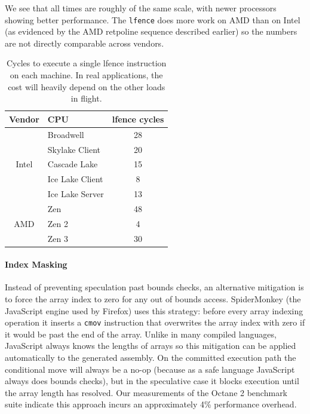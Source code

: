 We see that all times are roughly of the same scale, with newer processors showing better performance.
The \texttt{lfence} does more work on AMD than on Intel (as evidenced by the AMD retpoline sequence described earlier) so the numbers are not directly comparable across vendors.

\begin{table}[h]
  \begin{center}
  \begin{tabular}{ clc }
    \textbf{Vendor} & \textbf{CPU} & \textbf{lfence cycles} \\ \hline
    \multirow{5}{*}{Intel} & Broadwell        & 28 \\
                           & Skylake Client   & 20 \\
                           & Cascade Lake     & 15 \\
                           & Ice Lake Client  & 8 \\
                           & Ice Lake Server  & 13  \\ \hline
    \multirow{3}{*}{AMD}   & Zen              & 48 \\
                           & Zen 2            & 4 \\
                           & Zen 3            & 30 \\ \hline
  \end{tabular}
  \end{center}
  \caption{Cycles to execute a single lfence instruction on each machine.
    In real applications, the cost will heavily depend on the other loads in flight. }
  \label{table:lfence}
\end{table}

\paragraph{Index Masking}

Instead of preventing speculation past bounds checks, an alternative mitigation is to force the array index to zero for any out of bounds access.
SpiderMonkey (the JavaScript engine used by Firefox) uses this
strategy: before every array indexing operation it inserts a
\texttt{cmov} instruction that overwrites the array index with zero if it would be past the end of the array.
Unlike in many compiled languages, JavaScript always knows the lengths of arrays so this mitigation can be applied automatically to the generated assembly.
On the committed execution path the conditional move will always be a no-op (because as a safe language JavaScript always does bounds checks), but in the speculative case it blocks execution until the array length has resolved.
Our measurements of the Octane 2 benchmark suite indicate this approach incurs an approximately 4\% performance overhead.

